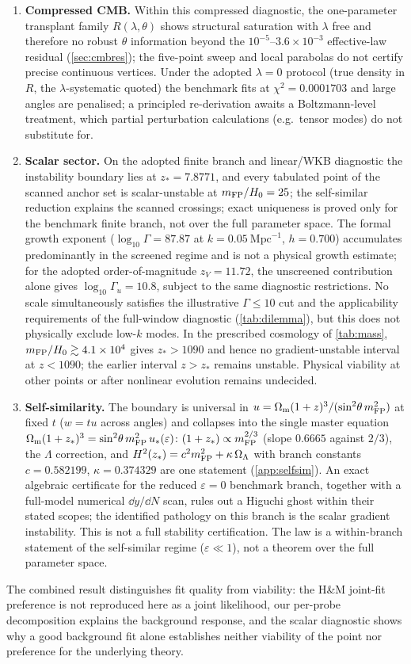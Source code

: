 \begin{enumerate}
\item \textbf{Compressed CMB.} Within this compressed diagnostic, the one-parameter transplant family $R(\lambda,\theta)$ shows structural saturation with $\lambda$ free and therefore no robust $\theta$ information beyond the $10^{-5}$--$3.6\times10^{-3}$ effective-law residual (\cref{sec:cmbres}); the five-point sweep and local parabolas do not certify precise continuous vertices. Under the adopted $\lambda=0$ protocol (true density in $R$, the $\lambda$-systematic quoted) the benchmark fits at $\chi^2=0.0001703$ and large angles are penalised; a principled re-derivation awaits a Boltzmann-level treatment, which partial perturbation calculations (e.g.\ tensor modes) do not substitute for.
\item \textbf{Scalar sector.} On the adopted finite branch and linear/WKB diagnostic the instability boundary lies at $z_*=7.8771$, and every tabulated point of the scanned anchor set is scalar-unstable at $m_{\mathrm{FP}}/H_0=25$; the self-similar reduction explains the scanned crossings; exact uniqueness is proved only for the benchmark finite branch, not over the full parameter space. The formal growth exponent ($\log_{10}\Gamma=87.87$ at $k=0.05\ \mathrm{Mpc}^{-1}$, $h=0.700$) accumulates predominantly in the screened regime and is not a physical growth estimate; for the adopted order-of-magnitude $z_V=11.72$, the unscreened contribution alone gives $\log_{10}\Gamma_u=10.8$, subject to the same diagnostic restrictions. No scale simultaneously satisfies the illustrative $\Gamma\le10$ cut and the applicability requirements of the full-window diagnostic (\cref{tab:dilemma}), but this does not physically exclude low-$k$ modes. In the prescribed cosmology of \cref{tab:mass}, $m_{\mathrm{FP}}/H_0\gtrsim4.1\times10^4$ gives $z_*>1090$ and hence no gradient-unstable interval at $z<1090$; the earlier interval $z>z_*$ remains unstable. Physical viability at other points or after nonlinear evolution remains undecided.
\item \textbf{Self-similarity.} The boundary is universal in $u=\Omega_{\mathrm m}(1+z)^3/(\sin^2\!\theta\,m_{\mathrm{FP}}^2)$ at fixed $t$ ($w=tu$ across angles) and collapses into the single master equation $\Omega_{\mathrm m}(1+z_*)^3=\sin^2\!\theta\,m_{\mathrm{FP}}^2\,u_*(\varepsilon)$: $(1+z_*)\propto m_{\mathrm{FP}}^{2/3}$ (slope $0.6665$ against $2/3$), the $\Lambda$ correction, and $H^2(z_*)=c^2m_{\mathrm{FP}}^2+\kappa\,\Omega_{\Lambda}$ with branch constants $c=0.582199$, $\kappa=0.374329$ are one statement (\cref{app:selfsim}). An exact algebraic certificate for the reduced $\varepsilon=0$ benchmark branch, together with a full-model numerical $\dd y/\dd N$ scan, rules out a Higuchi ghost within their stated scopes; the identified pathology on this branch is the scalar gradient instability. This is not a full stability certification. The law is a within-branch statement of the self-similar regime ($\varepsilon\ll1$), not a theorem over the full parameter space.
\end{enumerate}

The combined result distinguishes fit quality from viability: the H\&M joint-fit preference is not reproduced here as a joint likelihood, our per-probe decomposition explains the background response, and the scalar diagnostic shows why a good background fit alone establishes neither viability of the point nor preference for the underlying theory.
